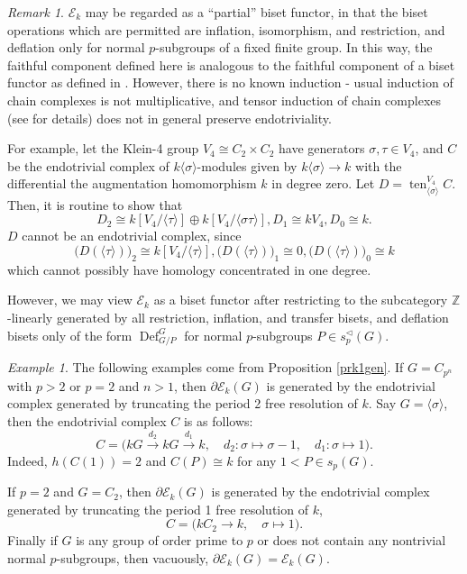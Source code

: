 \documentclass[10pt,letterpaper, boxed, cm]{amsart}
\newcommand{\Z}{\mathbb{Z}}
\newcommand{\Def}{\operatorname{Def}}
\newcommand{\TI}{\operatorname{ten}}
\newcommand{\calE}{\mathcal{E}}
\theoremstyle{remark}
\newtheorem{remark}[theorem]{Remark}
\newtheorem{example}[theorem]{Example}
\theoremstyle{definition}
\begin{document}
	\begin{remark}
		$\calE_k$ may be regarded as a ``partial'' biset functor, in that the biset operations which are permitted are inflation, isomorphism, and restriction, and deflation only for normal $p$-subgroups of a fixed finite group. In this way, the faithful component defined here is analogous to the faithful component of a biset functor as defined in \cite{Bou10}.  However, there is no known induction - usual induction of chain complexes is not multiplicative, and tensor induction of chain complexes (see \cite{E61} for details) does not in general preserve endotriviality.

		For example, let the Klein-4 group $V_4 \cong C_2 \times C_2$ have generators $\sigma, \tau \in V_4$, and $C$ be the endotrivial complex of $k\langle\sigma\rangle $-modules given by $k\langle \sigma \rangle \to k$ with the differential the augmentation homomorphism $k$ in degree zero. Let $D = \TI^{V_4}_{\langle\sigma\rangle} C$. Then, it is routine to show that \[ D_2 \cong  k[V_4/\langle \tau\rangle] \oplus k[V_4/\langle \sigma\tau\rangle], D_1 \cong kV_4, D_0 \cong k.\] $D$ cannot be an endotrivial complex, since \[\big(D(\langle \tau\rangle)\big)_2 \cong k[V_4/\langle\tau\rangle], \big(D(\langle \tau\rangle)\big)_1 \cong 0, \big(D(\langle \tau\rangle)\big)_0\cong k\] which cannot possibly have homology concentrated in one degree.

		However, we may view $\calE_k$ as a biset functor after restricting to the subcategory $\Z$-linearly generated by all restriction, inflation, and transfer bisets, and deflation bisets only of the form $\Def^G_{G/P}$ for normal $p$-subgroups $P \in s_p^\triangleleft(G)$.
	\end{remark}

	\begin{example}
		The following examples come from Proposition \ref{prk1gen}. If $G = C_{p^n}$ with $p > 2$ or $p = 2$ and $n > 1$, then $\partial\calE_k(G)$ is generated by the endotrivial complex generated by truncating the period 2 free resolution of $k$. Say $G = \langle\sigma\rangle$, then the endotrivial complex $C$ is as follows: \[C = \big(kG \xrightarrow{d_2} kG\xrightarrow{d_1} k, \quad d_2: \sigma \mapsto \sigma - 1, \quad d_1: \sigma \mapsto 1\big).\] Indeed, $h(C(1)) = 2$ and $C(P) \cong k$ for any $1 < P \in s_p(G)$.

		If $p=2$ and $G = C_2$, then $\partial\calE_k(G)$ is generated by the endotrivial complex generated by truncating the period 1 free resolution of $k$, \[C = \big(kC_2 \to k,\quad \sigma\mapsto 1\big).\] Finally if $G$ is any group of order prime to $p$ or does not contain any nontrivial normal $p$-subgroups, then vacuously, $\partial \calE_k(G) = \calE_k(G)$.
	\end{example}
\end{document}
